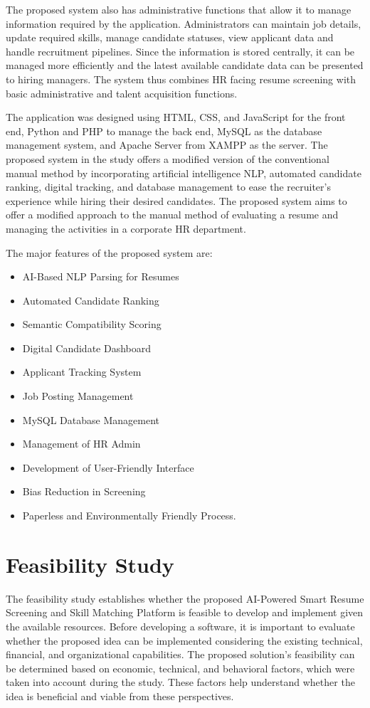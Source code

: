 \documentclass[12pt,a4paper]{report}
\begin{document}
The proposed system also has administrative functions that allow it to manage information required by the application. Administrators can maintain job details, update required skills, manage candidate statuses, view applicant data and handle recruitment pipelines. Since the information is stored centrally, it can be managed more efficiently and the latest available candidate data can be presented to hiring managers. The system thus combines HR facing resume screening with basic administrative and talent acquisition functions.

The application was designed using HTML, CSS, and JavaScript for the front end, Python and PHP to manage the back end, MySQL as the database management system, and Apache Server from XAMPP as the server. The proposed system in the study offers a modified version of the conventional manual method by incorporating artificial intelligence NLP, automated candidate ranking, digital tracking, and database management to ease the recruiter's experience while hiring their desired candidates. The proposed system aims to offer a modified approach to the manual method of evaluating a resume and managing the activities in a corporate HR department.

The major features of the proposed system are:

\begin{itemize}
\item AI-Based NLP Parsing for Resumes
\item Automated Candidate Ranking
\item Semantic Compatibility Scoring
\item Digital Candidate Dashboard
\item Applicant Tracking System
\item Job Posting Management
\item MySQL Database Management
\item Management of HR Admin
\item Development of User-Friendly Interface
\item Bias Reduction in Screening
\item Paperless and Environmentally Friendly Process.
\end{itemize}


\section{Feasibility Study}
The feasibility study establishes whether the proposed AI-Powered Smart Resume Screening and Skill Matching Platform is feasible to develop and implement given the available resources. Before developing a software, it is important to evaluate whether the proposed idea can be implemented considering the existing technical, financial, and organizational capabilities. The proposed solution’s feasibility can be determined based on economic, technical, and behavioral factors, which were taken into account during the study. These factors help understand whether the idea is beneficial and viable from these perspectives.
\end{document}
